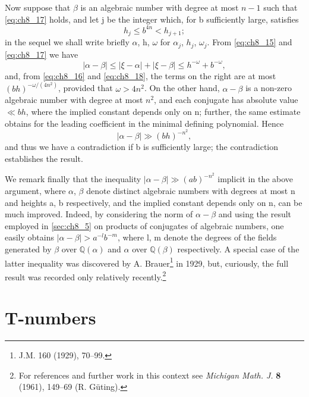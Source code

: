 Now suppose that $\beta$ is an algebraic number with degree at most $n-1$ such that \eqref{eq:ch8_17} holds, and let j be the integer which, for b sufficiently large, satisfies
\[h_j \le b^{4n} < h_{j+1}; \tag{18}\label{eq:ch8_18}\]
in the sequel we shall write briefly $\alpha$, h, $\omega$ for $\alpha_j$, $h_j$, $\omega_j$. From \eqref{eq:ch8_15} and \eqref{eq:ch8_17} we have
\[|\alpha - \beta| \le |\xi - \alpha| + |\xi - \beta| \le h^{-\omega} + b^{-\omega},\]
and, from \eqref{eq:ch8_16} and \eqref{eq:ch8_18}, the terms on the right are at most $(bh)^{-\omega/(4n^2)}$, provided that $\omega > 4n^2$. On the other hand, $\alpha-\beta$ is a non-zero algebraic number with degree at most $n^2$, and each conjugate has absolute value $\ll bh$, where the implied constant depends only on n; further, the same estimate obtains for the leading coefficient in the minimal defining polynomial. Hence
\[|\alpha-\beta| \gg (bh)^{-n^2},\]
and thus we have a contradiction if b is sufficiently large; the contradiction establishes the result.

We remark finally that the inequality $|\alpha-\beta| \gg (ab)^{-n^2}$ implicit in the above argument, where $\alpha$, $\beta$ denote distinct algebraic numbers with degrees at most n and heights a, b respectively, and the implied constant depends only on n, can be much improved. Indeed, by considering the norm of $\alpha-\beta$ and using the result employed in \autoref{sec:ch8_5} on products of conjugates of algebraic numbers, one easily obtains $|\alpha-\beta| > a^{-l}b^{-m}$, where l, m denote the degrees of the fields generated by $\beta$ over $\mathbb{Q}(\alpha)$ and $\alpha$ over $\mathbb{Q}(\beta)$ respectively. A special case of the latter inequality was discovered by A. Brauer\footnote{J.M. 160 (1929), 70--99.} in 1929, but, curiously, the full result was recorded only relatively recently.\footnote{For references and further work in this context see \textit{Michigan Math. J.} \textbf{8} (1961), 149--69 (R. Güting).}

\section{T-numbers}\label{sec:ch8_7}

